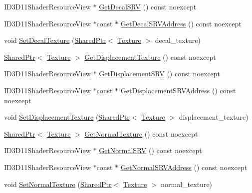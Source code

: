 \begin{DoxyCompactItemize}
I\+D3\+D11\+Shader\+Resource\+View $\ast$ \hyperlink{structmage_1_1_shaded_material_ad16addcaa9b32b7a9d5ce793d55b1b2c}{Get\+Decal\+S\+RV} () const noexcept
\item 
I\+D3\+D11\+Shader\+Resource\+View $\ast$const  $\ast$ \hyperlink{structmage_1_1_shaded_material_ac6bd86176058b7fdeb4c9a7823ff8c71}{Get\+Decal\+S\+R\+V\+Address} () const noexcept
\item 
void \hyperlink{structmage_1_1_shaded_material_a4acb72c80dfc51dacb5cba6621234685}{Set\+Decal\+Texture} (\hyperlink{namespacemage_a1e01ae66713838a7a67d30e44c67703e}{Shared\+Ptr}$<$ \hyperlink{classmage_1_1_texture}{Texture} $>$ decal\+\_\+texture)
\item 
\hyperlink{namespacemage_a1e01ae66713838a7a67d30e44c67703e}{Shared\+Ptr}$<$ \hyperlink{classmage_1_1_texture}{Texture} $>$ \hyperlink{structmage_1_1_shaded_material_acf3273d75933ca238075150dd7cc7dca}{Get\+Displacement\+Texture} () const noexcept
\item 
I\+D3\+D11\+Shader\+Resource\+View $\ast$ \hyperlink{structmage_1_1_shaded_material_ac33beb240df46ad6295425851cafc996}{Get\+Displacement\+S\+RV} () const noexcept
\item 
I\+D3\+D11\+Shader\+Resource\+View $\ast$const  $\ast$ \hyperlink{structmage_1_1_shaded_material_afc31aec2b4532b196306db049c3dddf6}{Get\+Displacement\+S\+R\+V\+Address} () const noexcept
\item 
void \hyperlink{structmage_1_1_shaded_material_ab96c9ab7165ebb330790b15460b53c3b}{Set\+Displacement\+Texture} (\hyperlink{namespacemage_a1e01ae66713838a7a67d30e44c67703e}{Shared\+Ptr}$<$ \hyperlink{classmage_1_1_texture}{Texture} $>$ displacement\+\_\+texture)
\item 
\hyperlink{namespacemage_a1e01ae66713838a7a67d30e44c67703e}{Shared\+Ptr}$<$ \hyperlink{classmage_1_1_texture}{Texture} $>$ \hyperlink{structmage_1_1_shaded_material_a879b003bf09d4985c028d134cdbe46eb}{Get\+Normal\+Texture} () const noexcept
\item 
I\+D3\+D11\+Shader\+Resource\+View $\ast$ \hyperlink{structmage_1_1_shaded_material_a5fd4dfbf132fa697fafbbac082ab8bdb}{Get\+Normal\+S\+RV} () const noexcept
\item 
I\+D3\+D11\+Shader\+Resource\+View $\ast$const  $\ast$ \hyperlink{structmage_1_1_shaded_material_a2b506a6d1ec48be536cb3318349bb2da}{Get\+Normal\+S\+R\+V\+Address} () const noexcept
\item 
void \hyperlink{structmage_1_1_shaded_material_a681531e5a979ebdc4a0e8933a2439c0f}{Set\+Normal\+Texture} (\hyperlink{namespacemage_a1e01ae66713838a7a67d30e44c67703e}{Shared\+Ptr}$<$ \hyperlink{classmage_1_1_texture}{Texture} $>$ normal\+\_\+texture)

\end{DoxyCompactItemize}
